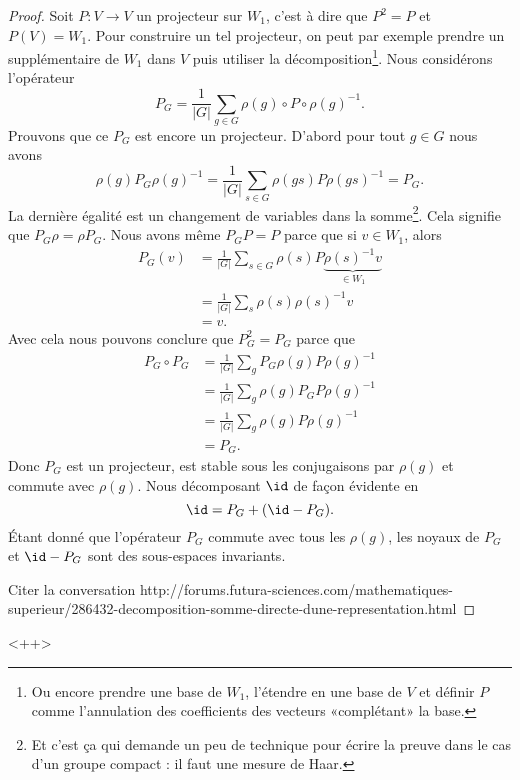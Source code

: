 \begin{proof}
    Soit \( P\colon V\to V\) un projecteur sur \( W_1\), c'est à dire que \( P^2=P\) et \( P(V)=W_1\). Pour construire un tel projecteur, on peut par exemple prendre un supplémentaire de \( W_1\) dans \( V\) puis utiliser la décomposition\footnote{Ou encore prendre une base de \( W_1\), l'étendre en une base de \( V\) et définir \( P\) comme l'annulation des coefficients des vecteurs «complétant» la base.}. Nous considérons l'opérateur
    \begin{equation}
        P_G=\frac{1}{ | G | }\sum_{g\in G}\rho(g)\circ P\circ \rho(g)^{-1}.
    \end{equation}
    Prouvons que ce \( P_G\) est encore un projecteur. D'abord pour tout \( g\in G\) nous avons
    \begin{equation}
        \rho(g)P_G\rho(g)^{-1}=\frac{1}{ | G | }\sum_{s\in G}\rho(gs)P\rho(gs)^{-1}=P_G.
    \end{equation}
    La dernière égalité est un changement de variables dans la somme\footnote{Et c'est ça qui demande un peu de technique pour écrire la preuve dans le cas d'un groupe compact : il faut une mesure de Haar.}. Cela signifie que \( P_G\rho=\rho P_G\). Nous avons même \( P_GP=P\) parce que si \( v\in W_1\), alors 
    \begin{subequations}
        \begin{align}
            P_G(v)&=\frac{1}{ | G | }\sum_{s\in G}\rho(s)P\underbrace{\rho(s)^{-1} v}_{\in W_1}\\
            &=\frac{1}{ | G | }\sum_s\rho(s)\rho(s)^{-1} v\\
            &=v.
        \end{align}
    \end{subequations}
    Avec cela nous pouvons conclure que \( P_G^2=P_G\) parce que
    \begin{subequations}
        \begin{align}
            P_G\circ P_G&=\frac{1}{ | G | }\sum_g P_G\rho(g)P\rho(g)^{-1}\\
            &=\frac{1}{ | G | }\sum_g \rho(g)P_GP\rho(g)^{-1}\\
            &=\frac{1}{ | G | }\sum_g \rho(g)P\rho(g)^{-1}\\
            &=P_G.
        \end{align}
    \end{subequations}
    Donc \( P_G\) est un projecteur, est stable sous les conjugaisons par \( \rho(g)\) et commute avec \( \rho(g)\). Nous décomposant \( \id\) de façon évidente en
    \begin{equation}
        \id=P_G+(\id-P_G).
    \end{equation}
    Étant donné que l'opérateur \( P_G\) commute avec tous les \( \rho(g)\), les noyaux de \( P_G\) et \( \id-P_G\) sont des sous-espaces invariants.

Citer la conversation
http://forums.futura-sciences.com/mathematiques-superieur/286432-decomposition-somme-directe-dune-representation.html

\end{proof}
<++>



